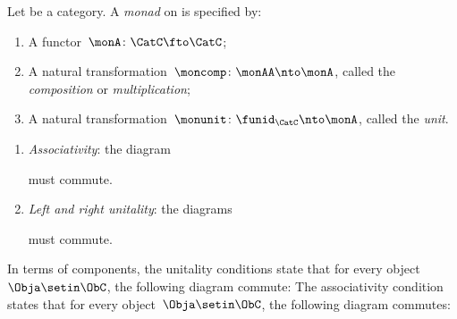 \begin{ctdefinition}[Monad]
    \label{def:monad}
    Let \CatC be a category.
    A \emph{monad} on \CatC is specified by:\\
    \constit
    \begin{enumerate}
        \item A functor~$ \monA \colon \CatC \fto \CatC$;
        \item A natural transformation~$\moncomp \colon \monAA \nto \monA$, called the \emph{composition} or \emph{multiplication};
        \item A natural transformation~$\monunit \colon \funid_\CatC \nto \monA$, called the \emph{unit}.
    \end{enumerate}
    \condit
    \begin{enumerate}
        \item \emph{Associativity}: the diagram
              \begin{center}
                  \label{eq:monad-associativity}
              \end{center}
              must commute.
        \item \emph{Left and right unitality}: the diagrams
              \begin{center}
                  \label{eq:monad-unitality}
              \end{center}
              must commute.
    \end{enumerate}
\end{ctdefinition}

\begin{remark}
    \label{rem:monad-condition-components}
    In terms of components, the unitality conditions state that for every object~$\Obja \setin \ObC$, the following diagram commute:
    The associativity condition states that for every object~$\Obja \setin \ObC$,
    the following diagram commutes:
\end{remark}


